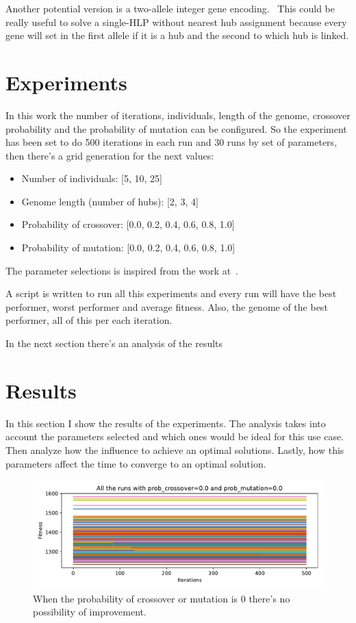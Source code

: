 \documentclass[12pt,oneside,a4paper]{article}
\begin{document}
    Another potential version is a two-allele integer gene encoding.~\cite{Capacitated_allo_Zorica}
    This could be really useful to solve a single-HLP without nearest hub assignment because every gene will set in
    the first allele if it is a hub and the second to which hub is linked.


    \section{Experiments}

    In this work the number of iterations, individuals, length of the genome, crossover probability and the
    probability of mutation can be configured.
    So the experiment has been set to do 500 iterations in each run and 30 runs by set of parameters, then there's a
    grid generation for the next values:
    \begin{itemize}
        \item Number of individuals: [5, 10, 25]
        \item Genome length (number of hubs): [2, 3, 4]
        \item Probability of crossover: [0.0, 0.2, 0.4, 0.6, 0.8, 1.0]
        \item Probability of mutation: [0.0, 0.2, 0.4, 0.6, 0.8, 1.0]
    \end{itemize}
    The parameter selections is inspired from the work at~\cite{Zhou2016/09}.

    A script is written to run all this experiments and every run will have the best performer, worst performer and
    average fitness.
    Also, the genome of the best performer, all of this per each iteration.

    In the next section there's an analysis of the results

    \newpage


    \section{Results}
    In this section I show the results of the experiments.
    The analysis takes into account the parameters selected and which ones would be ideal for this use case.
    Then analyze how the influence to achieve an optimal solutions.
    Lastly, how this parameters affect the time to converge to an optimal solution.
    \begin{figure}[h]
        \includegraphics[width=\textwidth]{no_cross_no_mut}
        \caption{When the probability of crossover or mutation is 0 there's no possibility of improvement.}
        \label{fig:prob0}
    \end{figure}
\end{document}
